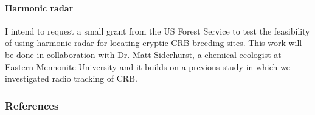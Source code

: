 \begin{refsection}
\paragraph{Harmonic radar} I intend to request a small grant from the US Forest Service to test the feasibility of using harmonic radar for locating cryptic CRB breeding sites. This work will be done in collaboration with Dr. Matt Siderhurst, a chemical ecologist at Eastern Mennonite University and it builds on a previous study in which we investigated radio tracking of CRB.

\subsubsection{References}
\printbibliography[heading=none]

\begin{comment}


\end{comment}
\end{refsection}
